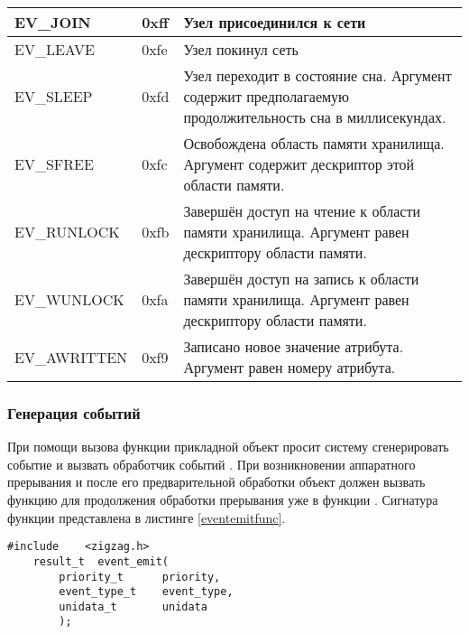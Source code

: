 \tabletail{\hline}
\tablelasttail{\hline}
\begin{supertabular}{|l|p{2cm}|p{9cm}|}
\label{eventtypestab}

   EV\_JOIN & 0xff & Узел присоединился к сети \\\hline
   EV\_LEAVE & 0xfe & Узел покинул сеть \\\hline
   EV\_SLEEP & 0xfd & Узел переходит в состояние сна. Аргумент  содержит предполагаемую продолжительность сна в миллисекундах. \\\hline
   EV\_SFREE & 0xfc & Освобождена область памяти хранилища. Аргумент  содержит дескриптор этой области памяти. \\\hline
   EV\_RUNLOCK & 0xfb & Завершён доступ на чтение к области памяти хранилища. Аргумент  равен дескриптору области памяти. \\\hline
   EV\_WUNLOCK & 0xfa & Завершён доступ на запись к области памяти хранилища. Аргумент  равен дескриптору области памяти. \\\hline
   EV\_AWRITTEN & 0xf9 & Записано новое значение атрибута. Аргумент  равен номеру атрибута. \\\hline

\end{supertabular}


\subsubsection{Генерация событий }

При помощи вызова функции  прикладной объект просит систему \zigzag сгенерировать событие и вызвать обработчик
событий . При возникновении аппаратного прерывания и после его предварительной обработки объект должен вызвать
функцию  для продолжения обработки прерывания уже в функции . Сигнатура функции 
представлена в листинге \ref{eventemitfunc}.

\begin{lstlisting}[caption=Функция \myfunc{event\_emit()} - генерация события., label=eventemitfunc ]
    #include    <zigzag.h>
    result_t  event_emit(
        priority_t      priority,
        event_type_t    event_type,
        unidata_t       unidata
        );
\end{lstlisting}

